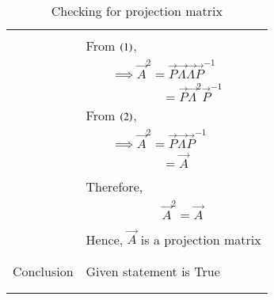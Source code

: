 \documentclass[journal,12pt]{IEEEtran}
\begin{document}
\begin{longtable}{|c|l|}
	&\\
	&From $\left(1\right)$,\\
	&$\qquad\implies \vec{A}^2=\vec{P}\vec{\Lambda}\vec{\Lambda}\vec{P}^{-1}$\\
	&$\qquad\qquad\qquad=\vec{P}\vec{\Lambda}^2\vec{P}^{-1}$\\
	&From $\left(2\right)$,\\
	&$\qquad\implies \vec{A}^2=\vec{P}\vec{\Lambda}\vec{P}^{-1}$\\
	&$\qquad\qquad\qquad=\vec{A}$\\
	&\\
	&Therefore,\\
	&$\qquad\qquad\qquad\vec{A}^2=\vec{A}$\\
	&\\
	& Hence, $\vec{A}$ is a projection matrix\\
	&\\
	\hline
	\multirow{3}{*}{Conclusion} & \\
	& Given statement is True\\
	&\\
	\hline
	\caption{Checking for projection matrix}
    \label{table:2}
\end{longtable}
\end{document}
